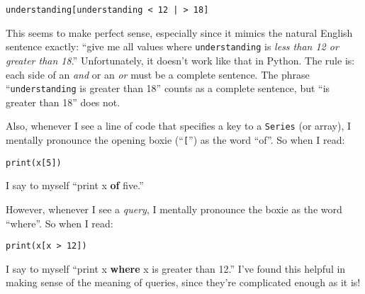 \begin{Verbatim}[fontsize=\small,samepage=true,frame=single,framesep=3mm]
understanding[understanding < 12 | > 18]
\end{Verbatim}

This seems to make perfect sense, especially since it mimics the natural
English sentence exactly: ``give me all values where \texttt{understanding} is
\textit{less than 12 or greater than 18}.'' Unfortunately, it doesn't work like
that in Python. The rule is: each side of an \textsl{and} or an \textsl{or}
must be a complete sentence. The phrase ``\texttt{understanding} is greater
than 18'' counts as a complete sentence, but ``is greater than 18'' does not.


Also, whenever I see a line of code that specifies a key to a \texttt{Series}
(or array), I mentally pronounce the opening boxie (``\texttt{[}'') as the word
``of''. So when I read:

\begin{Verbatim}[fontsize=\small,samepage=true,frame=single,framesep=3mm]
print(x[5])
\end{Verbatim}
\vspace{-.2in}

I say to myself ``print x \textbf{of} five.''

However, whenever I see a \textit{query}, I mentally pronounce the 
boxie as the word ``where''. So when I read:

\begin{Verbatim}[fontsize=\small,samepage=true,frame=single,framesep=3mm]
print(x[x > 12])
\end{Verbatim}
\vspace{-.2in}

I say to myself ``print x \textbf{where} x is greater than 12.'' I've found
this helpful in making sense of the meaning of queries, since they're
complicated enough as it is!
